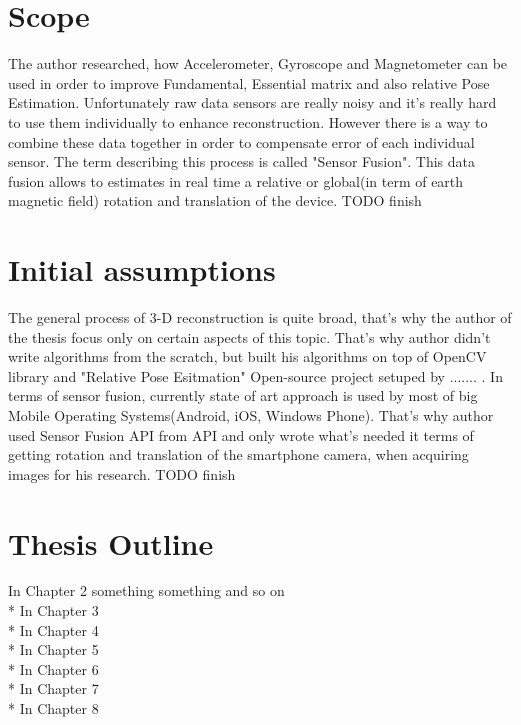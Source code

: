\section{Scope}
The author researched, how Accelerometer, Gyroscope and Magnetometer can be used in order to improve Fundamental, Essential matrix and also relative Pose Estimation. Unfortunately raw data sensors are really noisy and it's really hard to use them individually to enhance reconstruction. However there is a way to combine these data together in order to compensate error of each individual sensor. The term describing this process is called "Sensor Fusion". This data fusion allows to estimates in real time a relative or global(in term of earth magnetic field) rotation and translation of the device. TODO finish
\section{Initial assumptions}
The general process of 3-D reconstruction is quite broad, that's why the author of the thesis focus only on certain aspects of this topic. That's why author didn't write algorithms from the scratch, but built his algorithms on top of OpenCV library and "Relative Pose Esitmation" Open-source project setuped by ....... . In terms of sensor fusion, currently state of art approach is used by most of big Mobile Operating Systems(Android, iOS, Windows Phone). That's why author used Sensor Fusion API from API and only wrote what's needed it terms of getting rotation and translation of the smartphone camera, when acquiring images for his research. TODO finish
\section{Thesis Outline}
In Chapter 2 something something and so on
\\*
In Chapter 3
\\*
In Chapter 4
\\*
In Chapter 5
\\*
In Chapter 6
\\*
In Chapter 7
\\*
In Chapter 8




